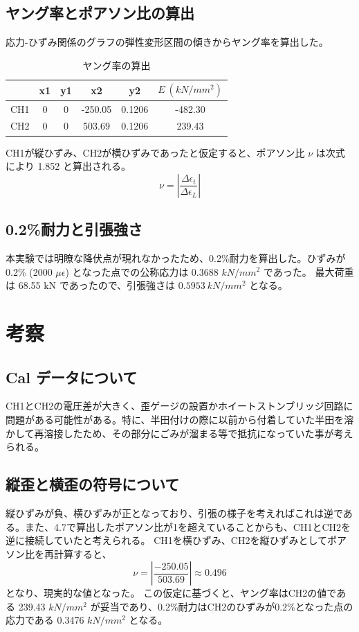 \documentclass[11pt, a4paper, dvipdfmx]{jsreport}
\begin{document}
\subsection{ヤング率とポアソン比の算出}
応力-ひずみ関係のグラフの弾性変形区間の傾きからヤング率を算出した。
\begin{table}[H]
    \centering
    \caption{ヤング率の算出}
    \begin{tabular}{|c|c|c|c|c|c|}
        \hline
         & x1 & y1 & x2 & y2 & $E\ (kN/mm^2)$ \\ \hline
        CH1 & 0 & 0 & -250.05 & 0.1206 & -482.30 \\ \hline
        CH2 & 0 & 0 & 503.69 & 0.1206 & 239.43 \\ \hline
    \end{tabular}
\end{table}


CH1が縦ひずみ、CH2が横ひずみであったと仮定すると、ポアソン比 $\nu$ は次式により 1.852 と算出される。
$$
\nu = \left| \frac{\Delta\epsilon_{t}}{\Delta\epsilon_{L}} \right|
$$

\subsection{0.2\%耐力と引張強さ}
本実験では明瞭な降伏点が現れなかったため、0.2\%耐力を算出した。ひずみが0.2\% (2000 $\mu \epsilon$) となった点での公称応力は 0.3688 $kN/mm^2$ であった。
最大荷重は 68.55 kN であったので、引張強さは $0.5953\ kN/mm^2$ となる。

\section{考察}
\subsection{Cal データについて}
CH1とCH2の電圧差が大きく、歪ゲージの設置かホイートストンブリッジ回路に問題がある可能性がある。特に、半田付けの際に以前から付着していた半田を溶かして再溶接したため、その部分にごみが溜まる等で抵抗になっていた事が考えられる。

\subsection{縦歪と横歪の符号について}
縦ひずみが負、横ひずみが正となっており、引張の様子を考えればこれは逆である。また、4.7で算出したポアソン比が1を超えていることからも、CH1とCH2を逆に接続していたと考えられる。
CH1を横ひずみ、CH2を縦ひずみとしてポアソン比を再計算すると、
$$
\nu = \left| \frac{-250.05}{503.69} \right| \approx 0.496
$$
となり、現実的な値となった。
この仮定に基づくと、ヤング率はCH2の値である 239.43 $kN/mm^2$ が妥当であり、0.2\%耐力はCH2のひずみが0.2\%となった点の応力である 0.3476 $kN/mm^2$ となる。
\end{document}
